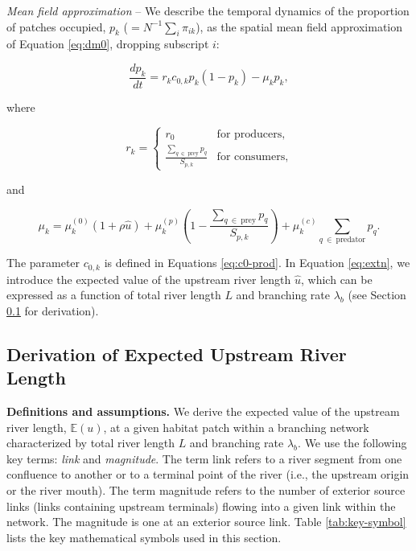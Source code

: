 \documentclass[11pt, class=article, crop=false]{standalone}
\begin{document}
\textit{Mean field approximation} --
We describe the temporal dynamics of the proportion of patches occupied, $p_k$ ($= N^{-1} \sum_i \pi_{ik}$), as the spatial mean field approximation of Equation \ref{eq:dm0}, dropping subscript $i$:

\begin{equation}
    \frac{dp_k}{dt} = r_{k} c_{0, k} p_{k} (1 - p_{k}) - \mu_{k} p_{k},
    \label{eq:master}
\end{equation}

where

\begin{equation}
    r_{k} = 
    \begin{cases}
        r_0 & \text{for producers,}\\
        \frac{\sum_{q~\in~\text{prey}} p_{q}}{S_{p,k}} & \text{for consumers,}
    \end{cases}
\end{equation}

and

\begin{equation}
    \mu_{k} = 
        \mu_{k}^{(0)} (1 + \rho \hat{u}) + 
        \mu_{k}^{(p)} \left(1 - \frac{\sum_{q~\in~\text{prey}} p_{q}}{S_{p, k}} \right) + 
        \mu_{k}^{(c)} \sum_{q~\in~\text{predator}} p_{q}.
    \label{eq:extn}    
\end{equation}

The parameter $c_{0, k}$ is defined in Equations \ref{eq:c0-prod}. 
In Equation \ref{eq:extn}, we introduce the expected value of the upstream river length $\hat{u}$, which can be expressed as a function of total river length $L$ and branching rate $\lambda_b$ (see Section \ref{updist} for derivation).

\newpage

\subsection{Derivation of Expected Upstream River Length} \label{updist}

\textbf{Definitions and assumptions.}
We derive the expected value of the upstream river length, $\mathbb{E}(u)$, at a given habitat patch within a branching network characterized by total river length $L$ and branching rate $\lambda_b$.
We use the following key terms: \textit{link} and \textit{magnitude}.
The term link refers to a river segment from one confluence to another or to a terminal point of the river (i.e., the upstream origin or the river mouth).
The term magnitude refers to the number of exterior source links (links containing upstream terminals) flowing into a given link within the network.
The magnitude is one at an exterior source link.
Table \ref{tab:key-symbol} lists the key mathematical symbols used in this section.
\end{document}
